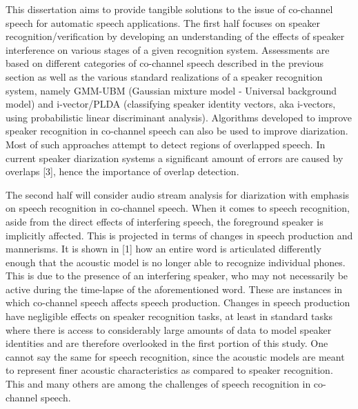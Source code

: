 This dissertation aims to provide tangible solutions to the issue of co-channel speech for automatic speech applications. The first half focuses on speaker recognition/verification by developing an understanding of the effects of speaker interference on various stages of a given recognition system. Assessments are based on different categories of co-channel speech described in the previous section as well as the various standard realizations of a speaker recognition system, namely GMM-UBM (Gaussian mixture model - Universal background model) and i-vector/PLDA (classifying speaker identity vectors, aka i-vectors, using probabilistic linear discriminant analysis). Algorithms developed to improve speaker recognition in co-channel speech can also be used to improve diarization. Most of such approaches attempt to detect regions of overlapped speech. In current speaker diarization systems a significant amount of errors are caused by overlaps [3], hence the importance of overlap detection.

The second half will consider audio stream analysis for diarization with emphasis on speech recognition in co-channel speech. When it comes to speech recognition, aside from the direct effects of interfering speech, the foreground speaker is implicitly affected. This is projected in terms of changes in speech production and mannerisms. It is shown in [1] how an entire word is articulated differently enough that the acoustic model is no longer able to recognize individual phones. This is due to the presence of an interfering speaker, who may not necessarily be active during the time-lapse of the aforementioned word. These are instances in which co-channel speech affects speech production. Changes in speech production have negligible effects on speaker recognition tasks, at least in standard tasks where there is access to considerably large amounts of data to model speaker identities and are therefore overlooked in the first portion of this study. One cannot say the same for speech recognition, since the acoustic models are meant to represent finer acoustic characteristics as compared to speaker recognition. This and many others are among the challenges of speech recognition in co-channel speech.